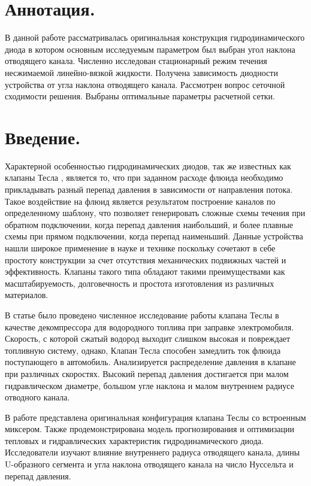 \documentclass[14pt,a4paper]{article}
\begin{document}
    
    \section*{Аннотация.}

        В данной работе рассматривалась оригинальная конструкция гидродинамического диода в котором основным исследуемым параметром был выбран угол наклона отводящего канала. Численно исследован стационарный режим течения несжимаемой линейно-вязкой жидкости. Получена зависимость диодности устройства от угла наклона отводящего канала. Рассмотрен вопрос сеточной сходимости решения. Выбраны оптимальные параметры расчетной сетки.

    \section*{Введение.}

        Характерной особенностью гидродинамических диодов, так же известных как клапаны Тесла \cite{TeslaValveReview}, является то, что при заданном расходе флюида необходимо прикладывать разный перепад давления в зависимости от направления потока. Такое воздействие на флюид является результатом построение каналов по определенному шаблону, что позволяет генерировать сложные схемы течения при обратном подключении, когда перепад давления наибольший, и более плавные схемы при прямом подключении, когда перепад наименьший. Данные устройства нашли широкое применение в науке и технике поскольку сочетают в себе простоту конструкции за счет отсутствия механических подвижных частей и эффективность. Клапаны такого типа обладают такими преимуществами как масштабируемость, долговечность и простота изготовления из различных материалов.

        В статье \cite{JIN20188888} было проведено численное исследование работы клапана Теслы в качестве декомпрессора для водородного топлива при заправке электромобиля. Скорость, с которой сжатый водород выходит слишком высокая и повреждает топливную систему, однако, Клапан Тесла способен замедлить ток флюида поступающего в автомобиль. Анализируется распределение давления в клапане при различных скоростях. Высокий перепад давления достигается при малом гидравлическом диаметре, большом угле наклона и малом внутреннем радиусе отводного канала. 
        
        В работе \cite{DU2023103670} представлена оригинальная конфигурация клапана Теслы со встроенным миксером. Также продемонстрирована модель прогнозирования и оптимизации тепловых и гидравлических характеристик гидродинамического диода. Исследователи изучают влияние внутреннего радиуса отводящего канала, длины U-образного сегмента и угла наклона отводящего канала на число Нуссельта и перепад давления.
        
\end{document}
